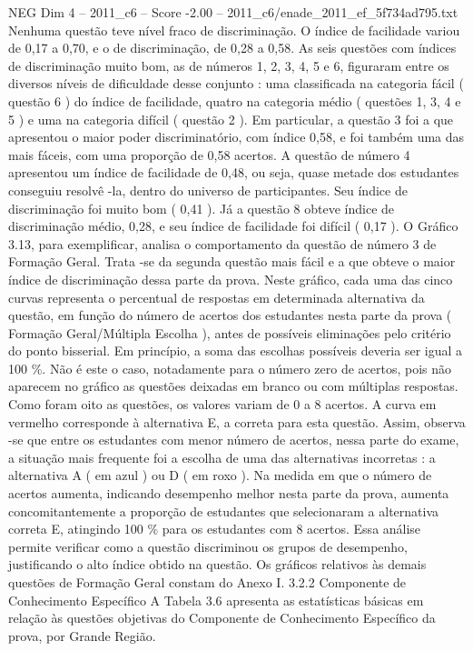 \begin{textsample}{NEG Dim 4 – 2011\_c6 – Score -2.00 – 2011\_c6/enade\_2011\_ef\_5f734ad795.txt}
Nenhuma questão teve nível fraco de discriminação.
O índice de facilidade variou de 0,17 a 0,70, e o de discriminação, de 0,28 a 0,58.
As seis questões com índices de discriminação muito bom, as de números 1, 2, 3, 4, 5 e 6, figuraram entre os diversos níveis de dificuldade desse conjunto : uma classificada na categoria fácil ( questão 6 ) do índice de facilidade, quatro na categoria médio ( questões 1, 3, 4 e 5 ) e uma na categoria difícil ( questão 2 ).
Em particular, a questão 3 foi a que apresentou o maior poder discriminatório, com índice 0,58, e foi também uma das mais fáceis, com uma proporção de 0,58 acertos.
A questão de número 4 apresentou um índice de facilidade de 0,48, ou seja, quase metade dos estudantes conseguiu resolvê -la, dentro do universo de participantes.
Seu índice de discriminação foi muito bom ( 0,41 ).
Já a questão 8 obteve índice de discriminação médio, 0,28, e seu índice de facilidade foi difícil ( 0,17 ).
O Gráfico 3.13, para exemplificar, analisa o comportamento da questão de número 3 de Formação Geral.
Trata -se da segunda questão mais fácil e a que obteve o maior índice de discriminação dessa parte da prova.
Neste gráfico, cada uma das cinco curvas representa o percentual de respostas em determinada alternativa da questão, em função do número de acertos dos estudantes nesta parte da prova ( Formação Geral/Múltipla Escolha ), antes de possíveis eliminações pelo critério do ponto bisserial.
Em princípio, a soma das escolhas possíveis deveria ser igual a 100 \%.
Não é este o caso, notadamente para o número zero de acertos, pois não aparecem no gráfico as questões deixadas em branco ou com múltiplas respostas.
Como foram oito as questões, os valores variam de 0 a 8 acertos.
A curva em vermelho corresponde à alternativa E, a correta para esta questão.
Assim, observa -se que entre os estudantes com menor número de acertos, nessa parte do exame, a situação mais frequente foi a escolha de uma das alternativas incorretas : a alternativa A ( em azul ) ou D ( em roxo ).
Na medida em que o número de acertos aumenta, indicando desempenho melhor nesta parte da prova, aumenta concomitantemente a proporção de estudantes que selecionaram a alternativa correta E, atingindo 100 \% para os estudantes com 8 acertos.
Essa análise permite verificar como a questão discriminou os grupos de desempenho, justificando o alto índice obtido na questão.
Os gráficos relativos às demais questões de Formação Geral constam do Anexo I. 3.2.2 Componente de Conhecimento Específico A Tabela 3.6 apresenta as estatísticas básicas em relação às questões objetivas do Componente de Conhecimento Específico da prova, por Grande Região.

\end{textsample}
